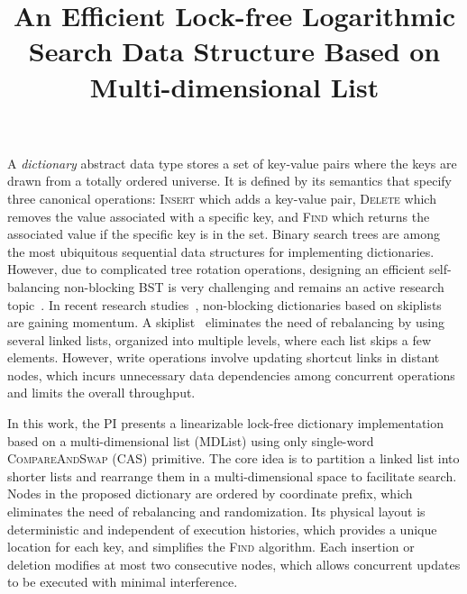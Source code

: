 \documentclass{article}
\begin{document}
\title{An Efficient Lock-free Logarithmic Search Data Structure Based on Multi-dimensional List}

\maketitle

A \emph{dictionary} abstract data type stores a set of key-value pairs where the keys are drawn from a totally ordered universe. 
It is defined by its semantics that specify three canonical operations: \textsc{Insert} which adds a key-value pair, \textsc{Delete} which removes the value associated with a specific key, and \textsc{Find} which returns the associated value if the specific key is in the set.
Binary search trees are among the most ubiquitous sequential data structures for implementing dictionaries. 
However, due to complicated tree rotation operations, designing an efficient self-balancing non-blocking BST is very challenging and remains an active research topic~\cite{brown2014general,natarajan2014fast,ellen2014amortized}.
In recent research studies~\cite{linden2013skiplist,sundell2004scalable,fraser2004practical}, non-blocking dictionaries based on skiplists are gaining momentum.
A skiplist~\cite{pugh1990skip} eliminates the need of rebalancing by using several linked lists, organized into multiple levels, where each list skips a few elements. 
However, write operations involve updating shortcut links in distant nodes, which incurs unnecessary data dependencies among concurrent operations and limits the overall throughput.

In this work, the PI presents a linearizable lock-free dictionary implementation based on a multi-dimensional list (MDList) using only single-word \textsc{CompareAndSwap} (CAS) primitive.
The core idea is to partition a linked list into shorter lists and rearrange them in a multi-dimensional space to facilitate search.
Nodes in the proposed dictionary are ordered by coordinate prefix, which eliminates the need of rebalancing and randomization.
Its physical layout is deterministic and independent of execution histories, which provides a unique location for each key, and simplifies the \textsc{Find} algorithm.
Each insertion or deletion modifies at most two consecutive nodes, which allows concurrent updates to be executed with minimal interference.
\end{document}
